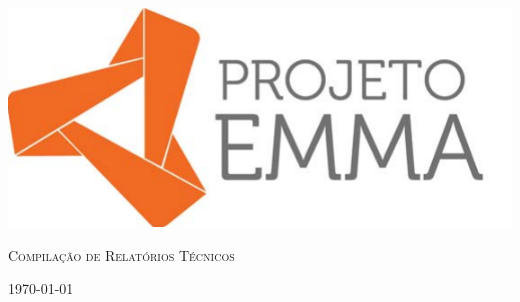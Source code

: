 \begin{titlepage}
	\centering
	\includegraphics{logo/EMMA-logo}
	\vfill
	{\scshape\LARGE Compilação de Relatórios Técnicos \par}
	\vfill

	{\large \today\par}
\end{titlepage}

% 
% 



